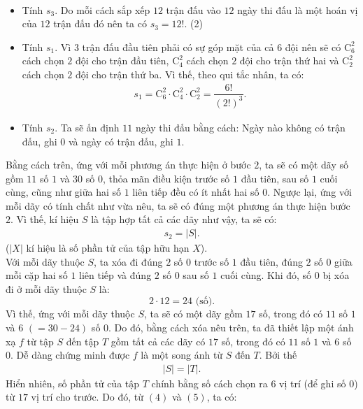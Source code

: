 \begin{bt}
{\begin{align}
		\end{align}
		\begin{itemize}
			\item Tính $s_3.$ Do mỗi cách sắp xếp $12$ trận đấu vào $12$ ngày thi đấu là một hoán vị của $12$ trận đấu đó nên ta có $s_3 = 12!$. \hfill(2)
			\item Tính $s_1.$ Vì $3$ trận đấu đầu tiên phải có sự góp mặt của cả $6$ đội nên sẽ có $\mathrm{C}^2_6$ cách chọn $2$ đội cho trận đầu tiên,  $\mathrm{C}^2_4$ cách chọn $2$ đội cho trận thứ hai và  $\mathrm{C}^2_2$ cách chọn $2$ đội cho trận thứ ba. Vì thế, theo qui tắc nhân, ta có:
			\begin{align} s_1 = \mathrm{C}^2_6 \cdot \mathrm{C}^2_4 \cdot \mathrm{C}^2_2 = \dfrac{6!}{(2!)^3}. \tag{3}
			\end{align}
			\item Tính $s_2$. Ta sẽ ấn định $11$ ngày thi đấu bằng cách: Ngày nào không có trận đấu, ghi $0$ và ngày có trận đấu, ghi $1$.
		\end{itemize}
		Bằng cách trên, ứng với mỗi phương án thực hiện ở bước $2$, ta sẽ có một dãy số gồm $11$ số $1$ và $30$ số $0$, thỏa mãn điều kiện trước số $1$ đầu tiên, sau số $1$ cuối cùng, cũng như giữa hai số $1$ liên tiếp đều có ít nhất hai số $0$. Ngược lại, ứng với mỗi dãy có tính chất như vừa nêu, ta sẽ có đúng một phương án thực hiện bước $2$. Vì thế, kí hiệu $S$ là tập hợp tất cả các dãy như vậy, ta sẽ có:
		\begin{align} s_2=\left| S\right|. \tag{4}
		\end{align}	
		($\left| X \right|$ kí hiệu là số phần tử của tập hữu hạn $X$).\\
		Với mỗi dãy thuộc $S$, ta xóa đi đúng $2$ số $0$ trước số $1$ đầu tiên, đúng $2$ số $0$ giữa mỗi cặp hai số $1$ liên tiếp và đúng $2$ số $0$ sau số $1$ cuối cùng. Khi đó, số $0$ bị xóa đi ở mỗi dãy thuộc $S$ là: $$2\cdot 12 = 24 \text{ (số)}.$$
		Vì thế, ứng với mỗi dãy thuộc $S$, ta sẽ có một dãy gồm $17$ số, trong đó có $11$ số $1$ và $6$  $(=30-24)$ số $0$. Do đó, bằng cách xóa nêu trên, ta đã thiết lập một ánh xạ $f$ từ tập $S$ đến tập $T$ gồm tất cả các dãy có $17$ số, trong đó có $11$ số $1$ và $6$ số $0$. Dễ dàng chứng minh được $f$ là một song ánh từ $S$ đến $T$. Bởi thế
		\begin{align}
		\left| S\right| =\left| T\right| . \tag{5}
		\end{align}
		Hiển nhiên, số phần tử của tập $T$ chính bằng số cách chọn ra $6$ vị trí (để ghi số $0$) từ $17$ vị trí cho trước.
		Do đó, từ $(4)$ và $(5)$, ta có:
}
\end{bt}
